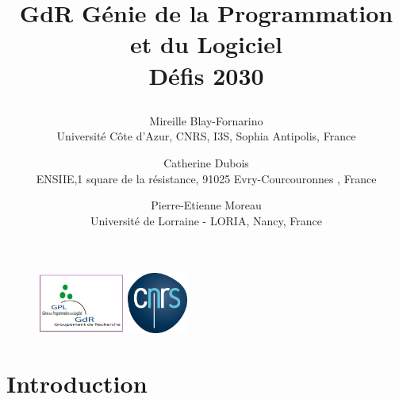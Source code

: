 \documentclass[11pt]{article}
\newcommand{\GDR}{GdR\xspace}
\begin{document}
\begin{titlepage}
\begin{figure}
\begin{minipage}[h]{.95\linewidth}
\centering
\includegraphics[height=2cm]{images/logo-gdr-gpl.jpg}
\hfill
\includegraphics[height=2cm]{images/CNRS.png}

\end{minipage} 
\end{figure}

\title{


{\GDR} Génie de la Programmation et du Logiciel\\ 
Défis 2030}



\author{Mireille Blay-Fornarino \\
{Université Côte d’Azur, CNRS, I3S, Sophia Antipolis, France}
\and
Catherine Dubois\\
{ENSIIE,1 square de la résistance, 91025 Evry-Courcouronnes , France}
\and
Pierre-Etienne Moreau\\
{Université de Lorraine - LORIA, Nancy, France}
}


\end{titlepage}
\maketitle
\newpage
\tableofcontents
\newpage
\section{Introduction}
\end{document}
